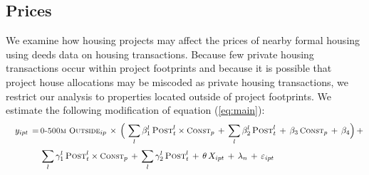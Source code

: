 \documentclass[12pt]{article}
\begin{document}






\subsection{Prices}\label{section:resultsprices}


We examine how housing projects may affect the prices of nearby formal housing using deeds data on housing transactions.  Because few private housing transactions occur within project footprints and because it is possible that project house allocations may be miscoded as private housing transactions, we restrict our analysis to properties located outside of project footprints.  We estimate the following modification of equation (\ref{eq:main}):
\begin{align}\label{eq:mainprice}
\begin{split}
\quad y_{ipt} \, =& \, \textsc{\small 0-500m Outside}_{ip} \, \times \, \Big( \, \sum_{l}\beta^{l}_1 \, \textsc{Post}^{l}_{t} \times\textsc{\small Const}_{p} \, + \, \sum_{l}\beta^{l}_2 \, \textsc{Post}^{l}_{t} \, + \, \beta_3 \, \textsc{\small Const}_{p} \, +\, \beta_4 \Big) \, + \\[.2em]
& \, \sum_{l}\gamma^{l}_1 \, \textsc{Post}^{l}_{t} \times\textsc{\small Const}_{p} \, + \, \sum_{l}\gamma^{l}_2 \, \textsc{Post}^{l}_{t}  \, +  \, \theta \, X_{ipt} \, + \, \lambda_{n} \, +  \, \varepsilon_{ipt} \quad 
\end{split}
\end{align} 
\end{document}
